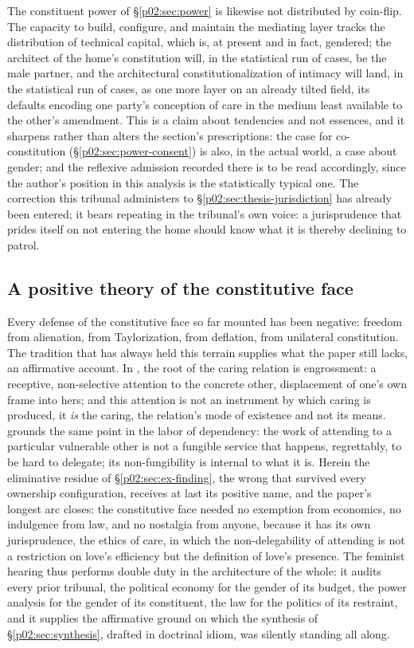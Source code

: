 \documentclass[11pt,a4paper]{article}
\begin{document}
The constituent power of \S\ref{p02:sec:power} is likewise not distributed by coin-flip. The capacity to build, configure, and maintain the mediating layer tracks the distribution of technical capital, which is, at present and in fact, gendered; the architect of the home's constitution will, in the statistical run of cases, be the male partner, and the architectural constitutionalization of intimacy will land, in the statistical run of cases, as one more layer on an already tilted field, its defaults encoding one party's conception of care in the medium least available to the other's amendment. This is a claim about tendencies and not essences, and it sharpens rather than alters the section's prescriptions: the case for co-constitution (\S\ref{p02:sec:power-consent}) is also, in the actual world, a case about gender; and the reflexive admission recorded there is to be read accordingly, since the author's position in this analysis is the statistically typical one. The correction this tribunal administers to \S\ref{p02:sec:thesis-jurisdiction} has already been entered; it bears repeating in the tribunal's own voice: a jurisprudence that prides itself on not entering the home should know what it is thereby declining to patrol.

\subsection{A positive theory of the constitutive face}
\label{p02:sec:fem-positive}

Every defense of the constitutive face so far mounted has been negative: freedom from alienation, from Taylorization, from deflation, from unilateral constitution. The tradition that has always held this terrain supplies what the paper still lacks, an affirmative account. In \textcite{noddings1984caring}, the root of the caring relation is engrossment: a receptive, non-selective attention to the concrete other, displacement of one's own frame into hers; and this attention is not an instrument by which caring is produced, it \emph{is} the caring, the relation's mode of existence and not its means. \textcite{kittay1999love} grounds the same point in the labor of dependency: the work of attending to a particular vulnerable other is not a fungible service that happens, regrettably, to be hard to delegate; its non-fungibility is internal to what it is. Herein the eliminative residue of \S\ref{p02:sec:ex-finding}, the wrong that survived every ownership configuration, receives at last its positive name, and the paper's longest arc closes: the constitutive face needed no exemption from economics, no indulgence from law, and no nostalgia from anyone, because it has its own jurisprudence, the ethics of care, in which the non-delegability of attending is not a restriction on love's efficiency but the definition of love's presence. The feminist hearing thus performs double duty in the architecture of the whole: it audits every prior tribunal, the political economy for the gender of its budget, the power analysis for the gender of its constituent, the law for the politics of its restraint, and it supplies the affirmative ground on which the synthesis of \S\ref{p02:sec:synthesis}, drafted in doctrinal idiom, was silently standing all along.
\end{document}
